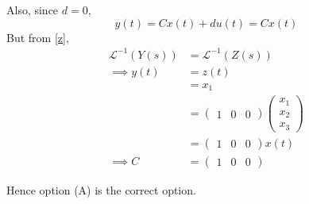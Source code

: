 \documentclass[journal,12pt,twocolumn]{IEEEtran}
\begin{document}
Also, since $d=0$, 
\begin{equation}
    y(t)= Cx(t)+du(t) = Cx(t)
\end{equation}
But from \ref{z}, 
\begin{align}
    \mathcal{L}^{-1}(Y(s)) &= \mathcal{L}^{-1}(Z(s))\\
    \implies y(t) &= z(t)\\
                  &= x_1\\
                  &= \begin{pmatrix}1 & 0 & 0\end{pmatrix} \begin{pmatrix}x_1\\x_2\\x_3\end{pmatrix}\\
                  &= \begin{pmatrix}1 & 0 & 0\end{pmatrix}x(t)\\
    \implies C &= \begin{pmatrix}1 & 0 & 0\end{pmatrix}
\end{align}

Hence option (A) is the correct option.
\end{document}
